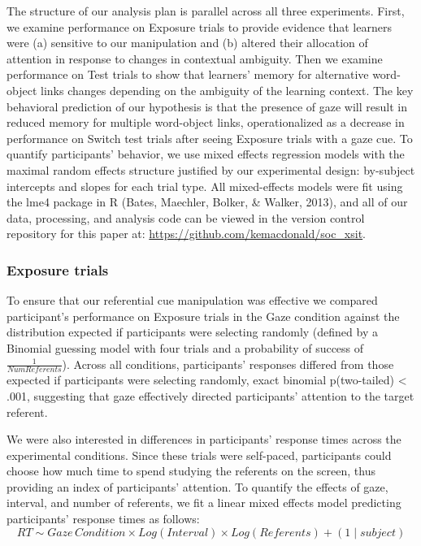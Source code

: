 \documentclass[a4paper,man,natbib]{apa6}
\begin{document}
The structure of our analysis plan is parallel across all three
experiments. First, we examine performance on Exposure trials to provide
evidence that learners were (a) sensitive to our manipulation and (b)
altered their allocation of attention in response to changes in
contextual ambiguity. Then we examine performance on Test trials to show
that learners' memory for alternative word-object links changes
depending on the ambiguity of the learning context. The key behavioral
prediction of our hypothesis is that the presence of gaze will result in
reduced memory for multiple word-object links, operationalized as a
decrease in performance on Switch test trials after seeing Exposure
trials with a gaze cue. To quantify participants' behavior, we use mixed
effects regression models with the maximal random effects structure
justified by our experimental design: by-subject intercepts and slopes
for each trial type. All mixed-effects models were fit using the lme4
package in R (Bates, Maechler, Bolker, \& Walker, 2013), and all of our
data, processing, and analysis code can be viewed in the version control
repository for this paper at:
\url{https://github.com/kemacdonald/soc_xsit}.

\subsubsection{Exposure trials}\label{exposure-trials}

To ensure that our referential cue manipulation was effective we
compared participant's performance on Exposure trials in the Gaze
condition against the distribution expected if participants were
selecting randomly (defined by a Binomial guessing model with four
trials and a probability of success of \(\frac{1}{Num Referents}\)).
Across all conditions, participants' responses differed from those
expected if participants were selecting randomly, exact binomial
p(two-tailed) \textless{} .001, suggesting that gaze effectively
directed participants' attention to the target referent.

We were also interested in differences in participants' response times
across the experimental conditions. Since these trials were self-paced,
participants could choose how much time to spend studying the referents
on the screen, thus providing an index of participants' attention. To
quantify the effects of gaze, interval, and number of referents, we fit
a linear mixed effects model predicting participants' response times as
follows:
\[RT \sim Gaze \, Condition \times Log(Interval) \times Log(Referents) + (1 \mid subject)\]
\end{document}
